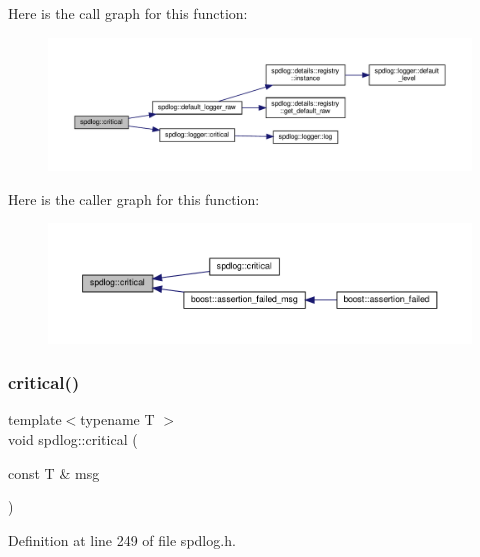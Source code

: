 Here is the call graph for this function\+:
\nopagebreak
\begin{figure}[H]
\begin{center}
\leavevmode
\includegraphics[width=350pt]{namespacespdlog_a753989ee0011b7d977e04a278b9380a2_cgraph}
\end{center}
\end{figure}
Here is the caller graph for this function\+:
\nopagebreak
\begin{figure}[H]
\begin{center}
\leavevmode
\includegraphics[width=350pt]{namespacespdlog_a753989ee0011b7d977e04a278b9380a2_icgraph}
\end{center}
\end{figure}
\mbox{\label{namespacespdlog_a2c707fb3d3d12a244ebfe3e40b417edc}} 
\subsubsection{\texorpdfstring{critical()}{critical()}\hspace{0.1cm}{\footnotesize\ttfamily [2/2]}}
{\footnotesize\ttfamily template$<$typename T $>$ \\
void spdlog\+::critical (\begin{DoxyParamCaption}\item[{const T \&}]{msg }\end{DoxyParamCaption})\hspace{0.3cm}{\ttfamily [inline]}}



Definition at line 249 of file spdlog.\+h.

